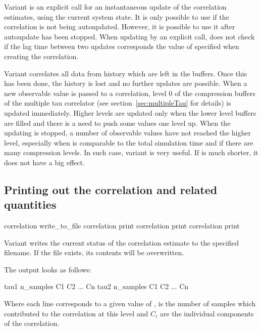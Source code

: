 Variant  is an explicit call for an instantaneous 
update of the correlation estimates, using the current system
state. It is only possible to use  if the correlation
is not being autoupdated. However, it is possible to use it
after autoupdate has been stopped. When updating by an explicit
call, \es does not check if the lag time between two updates
corresponds the value of  specified when creating the 
correlation.

Variant  correlates all data from history which are left in
the buffers. Once this has been done, the history is lost and no
further updates are possible. 
When a new observable value is passed to a correlation,
level 0 of the compression buffers of the multiple tau
correlator (see section~\ref{sec:multipleTau} for details) 
is updated immediately. Higher levels are
updated only when the lower level buffers are filled and
there is a need to push some values one level up. When the
updating is stopped, a number of observable values have not
reached the higher level, especially when  
is comparable to the total simulation time
and if there are many compression levels. In such case,
variant  is very useful. If  
is much shorter, it does not have a big effect.


\subsection{Printing out the correlation and related quantities}
\label{ssec:CorrError}
\begin{essyntax}
 correlation  write_to_file 
 correlation  print 
 correlation  print  
 correlation  print 
\end{essyntax}

Variant  writes the current status of the correlation
estimate to the specified filename. If the file exists, its contents will
be overwritten.

The output looks as follows:
\begin{code}
tau1 n_samples C1 C2 ... Cn
tau2 n_samples C1 C2 ... Cn
\end{code}
Where each line corresponds to a given value of ,  is the number
of samples which contributed to the correlation at this level and $C_i$ are the individual
components of the correlation.

